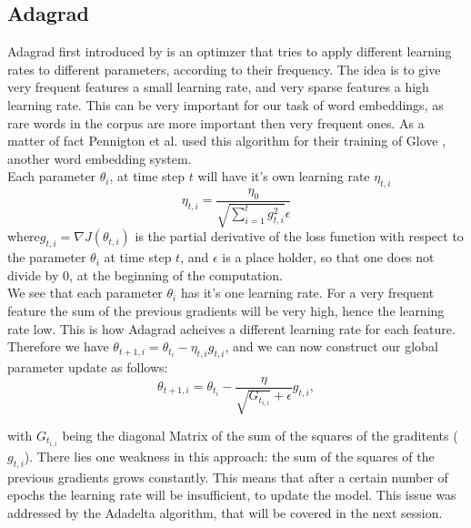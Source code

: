 {\subsection{Adagrad}\label{ssec:adagrad}
Adagrad first introduced by \cite{adagrad} is an optimzer that tries to apply different learning rates to different parameters, according to their frequency. The idea is to give very frequent features a small learning rate, and very sparse features a high learning rate. This can be very important for our task of word embeddings, as rare words in the corpus are more important then very frequent ones. As a matter of fact Pennigton et al. used this algorithm for their training of Glove \cite{Glove}, another word embedding system. \\
Each parameter $\theta_i$, at time step $t$ will have it's own learning rate $\eta_{t,i}$
 \begin{equation}
\eta_{t,i} = \frac{\eta_0}{\sqrt{\sum^{t}_{i=1} g^{2}_{t,i}} \epsilon}
\end{equation}
where$g_{t,i} = \nabla J(\theta_{t,i})$  is the partial derivative of the loss function with respect to the parameter $\theta_i$ at time step $t$, and $\epsilon$ is a place holder, so that one does not divide by $0$, at the beginning of the computation.\\ We see that each parameter $\theta_{i}$ has it's one learning rate. For a very frequent feature the sum of the previous gradients will be very high, hence the learning rate low. This is how Adagrad acheives a different learning rate for each feature. 
Therefore we have $ \theta_{t+1,i} = \theta_{t_i} - \eta_{t,i} g_{t,i} $, and we can now construct our global parameter update as follows: 
\begin{equation}
\theta_{t+1,i} = \theta_{t_i}- \frac{\eta}{\sqrt{G_{t_{i,i}}} + \epsilon} g_{t,i}, 
\end{equation} 

with  $G_{t_{i,i}}$ being the diagonal Matrix of the sum of the squares of the graditents ($g_{t,i} $). 
There lies one weakness in this approach: the sum of the squares of the previous gradients grows constantly. This means that after a certain number of epochs the learning rate will be insufficient, to update the model. This issue was addressed by the Adadelta algorithm, that will be covered in the next session. 

}
